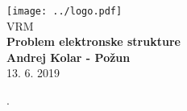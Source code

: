 \documentclass{article}
\begin{document}
\begin{titlepage}
    \begin{center}
        \vspace*{1cm}
        \Large
\texttt{[image: ../logo.pdf]}\\
        \Large
\vspace{1cm}
        VRM\\
        \huge
        \textbf{Problem elektronske strukture\\}
\Large  
        \vspace{1cm}
        \textbf{Andrej Kolar - Po{\v z}un\\}
        \vspace{0.8cm}
 13. 6. 2019

\vfill
\normalsize
\end{center}. 
\end{titlepage}
\newpage
{}
\end{document}
